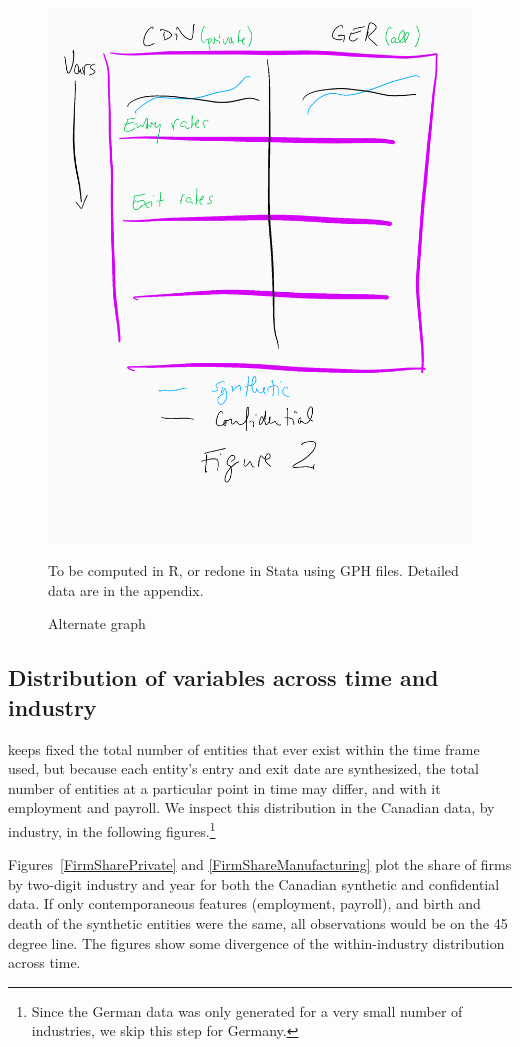 \begin{figure} [H]
\centering
\label{tab:Can:FirmDynamics}
\includegraphics[width=.8\linewidth]{graphs/Figure2-placeholder.png} 
\caption{Alternate graph} 
\begin{minipage}{0.48\linewidth}
{\footnotesize To be computed in R, or redone in Stata using GPH files. Detailed data are in the appendix. \par}
\end{minipage}
\end{figure}


\subsection{Distribution of variables across time and industry}

\SynLBD{} keeps fixed the total number of entities that ever exist within the time frame used, but because each entity's entry and exit date are synthesized, the total number of entities at a particular point in time may differ, and with it employment and payroll. We inspect this distribution in the Canadian data, by industry, in the following figures.\footnote{Since the German data was only generated for a very small number of industries, we skip this step for Germany.} 


Figures~\ref{FirmSharePrivate} and \ref{FirmShareManufacturing} plot the share of firms by two-digit industry and year for both the Canadian synthetic  and confidential data. If only contemporaneous features (employment, payroll), and birth and death of the synthetic entities were the same, all observations would be on the 45 degree line. The figures show some divergence of the within-industry distribution across time. 


